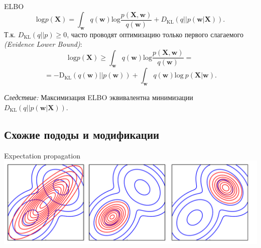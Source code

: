 \documentclass[10pt,pdf,utf8,russian,aspectratio=169]{beamer}
\begin{document}
\begin{frame}{ELBO}
\[
\text{log} p(\mathbf{X}) =  \int_{\mathbf{w}} q(\mathbf{w}) \text{log}\frac{p(\mathbf{X}, \mathbf{w}) }{q(\mathbf{w})} +  D_\text{KL}(q||p(\mathbf{w}|\mathbf{X})).
\]
Т.к. $D_\text{KL}(q||p) \geq 0$, часто проводят оптимизацию только первого слагаемого \\ \textit{(Evidence Lower Bound)}:
\[
\text{log} p(\mathbf{X}) \geq  \int_{\mathbf{w}} q(\mathbf{w}) \text{log}\frac{p(\mathbf{X}, \mathbf{w}) }{q(\mathbf{w})} = 
\] 
$$
= -\text{D}_\text{KL} (q(\mathbf{w})||p(\mathbf{w})) + \int_{\mathbf{w}} q(\mathbf{w})\text{log}~{p(\mathbf{X}|\mathbf{w})}.
$$

\textit{Следствие:} Максимизация ELBO эквивалентна минимизации $D_\text{KL}(q||p(\mathbf{w}|\mathbf{X}))$.

\end{frame}

\begin{frame}
\begin{figure}
  \centering
\label{fig:1}\qquad

\end{figure}
\end{frame}


\subsection{Схожие пододы и модификации}
\begin{frame}{Expectation propagation}
\includegraphics[width=\textwidth]{bishop.png}
\end{frame}
\end{document}
